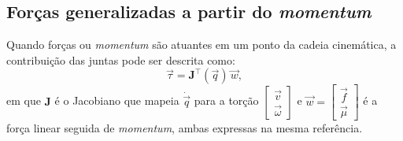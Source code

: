 



\subsection{Forças generalizadas a partir do \emph{momentum}}
Quando forças ou \emph{momentum} são atuantes em um ponto da cadeia cinemática, a contribuição das juntas pode ser descrita como:
\begin{equation}
\vec \tau=
\mathbf J^{\top}(\vec q)\,\vec w,
\label{eq:tau_Jt_w}
\end{equation}
em que $\mathbf J$ é o Jacobiano que mapeia $\dot{\vec q}$ para a torção $\begin{bmatrix}\vec v\\ \vec \omega\end{bmatrix}$ e $\vec w=\begin{bmatrix}\vec f\\ \vec \mu\end{bmatrix}$ é a força linear seguida de \emph{momentum}, ambas expressas na mesma referência.

